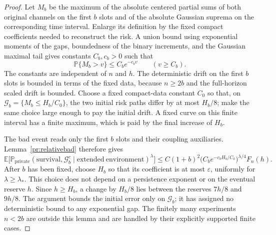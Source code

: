 \begin{proof}
Let $M_b$ be the maximum of the absolute centered partial sums of
both original channels on the first $b$ slots and of the absolute
Gaussian suprema on the corresponding time interval. Enlarge its
definition by the fixed compact coefficients needed to reconstruct
the risk. A union bound using exponential moments of the gaps,
boundedness of the binary increments, and the Gaussian maximal tail
gives constants $C_b,c_b>0$ such that
\[
 \mathbb P\{M_b>v\}\le C_b e^{-c_b v}
 \qquad(v\ge C_b).
\]
The constants are independent of $n$ and $h$. The deterministic drift
on the first $b$ slots is bounded in terms of the fixed data, because
$n\ge2b$ and the full-horizon scaled drift is bounded.
Choose a fixed compact-data constant $C_0$ so that, on
$\mathcal G_b=\{M_b\le H_b/C_0\}$, the two initial risk paths differ
by at most $H_b/8$; make the same choice large enough to pay the
initial drift. A fixed curve on this finite interval has a finite
maximum, which is paid by the final increase of $H_b$.

The bad event reads only the first $b$ slots and their coupling
auxiliaries. Lemma~\ref{pr:relativebad} therefore gives
\[
 \mathbb E\bigl[
   \mathbb P_{\mathrm{private}}
      (\mathrm{survival},\mathcal G_b^c
           \mid\mathrm{extended\ environment})^{\lambda}\bigr]
 \le C(1+b)^2
       \bigl(C_b e^{-c_bH_b/C_0}\bigr)^{\lambda/4}F_n(h).
\]
After $b$ has been fixed, choose $H_b$ so that its coefficient is at
most $\varepsilon$, uniformly for $\lambda\ge\lambda_*$. This choice
does not depend on a persistence exponent or on the eventual reserve
$h$. Since $h\ge H_b$, a change by $H_b/8$ lies between the reserves
$7h/8$ and $9h/8$. The argument bounds the initial error only on
$\mathcal G_b$; it has assigned no deterministic bound to any
exponential gap. The finitely many experiments $n<2b$ are outside this
lemma and are handled by their explicitly supported finite cases.
\end{proof}

